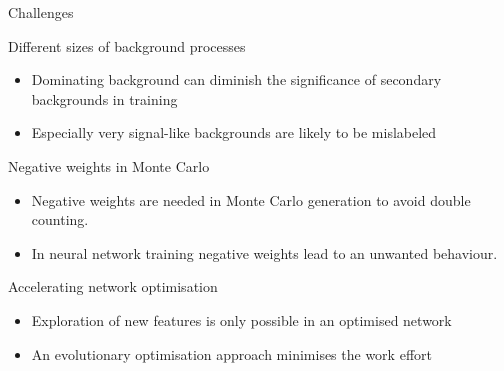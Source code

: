 \begin{frame}{Challenges}
    \begin{block}{Different sizes of background processes}
        \begin{itemize}
            \item Dominating background can diminish the significance of secondary backgrounds in training
            \item Especially very signal-like backgrounds are likely to be mislabeled
        \end{itemize}
    \end{block}
    \begin{block}{Negative weights in Monte Carlo}
        \begin{itemize}
            \item Negative weights are needed in Monte Carlo generation to avoid double counting.
            \item In neural network training negative weights lead to an unwanted behaviour.
        \end{itemize}
    \end{block}
    \begin{block}{Accelerating network optimisation}
        \begin{itemize}
            \item Exploration of new features is only possible in an optimised network
            \item An evolutionary optimisation approach minimises the work effort
        \end{itemize}
    \end{block}
\end{frame}